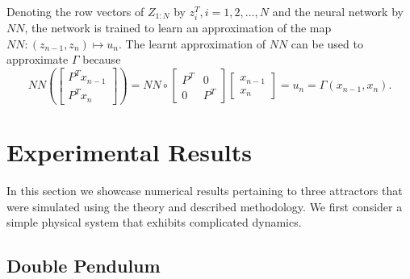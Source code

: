 Denoting the row vectors of $Z_{1:N}$ by  $z_i^T, i=1,2,\ldots,N$ and the neural network by $NN$, the network is trained to learn an approximation of the map
$NN: (z_{n-1},z_n) \mapsto  u_n.
$
The learnt approximation of $NN$ can be used to approximate $\Gamma$ because 
\begin{equation}\label{Seq_RNN}
  NN\left( \begin{bmatrix} 
    P^Tx_{n-1} \\
    P^Tx_n
    \end{bmatrix}
    \right) = NN \circ 
    \begin{bmatrix}
    P^T & 0 \\
    0 & P^T 
    \end{bmatrix}\begin{bmatrix}
    x_{n-1}\\
    x_n
    \end{bmatrix} = u_n = \Gamma(x_{n-1},x_n).
\end{equation}


\section{Experimental Results}
In this section we showcase numerical results pertaining to three attractors that were simulated using the theory and described methodology. We first consider a simple physical system that exhibits complicated dynamics.
\subsection{Double Pendulum}

